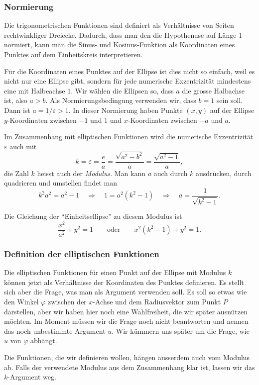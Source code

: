 \subsubsection{Normierung}
Die trigonometrischen Funktionen sind definiert als Verhältnisse 
von Seiten rechtwinkliger Dreiecke.
Dadurch, dass man den die Hypothenuse auf Länge $1$ normiert, 
kann man die Sinus- und Kosinus-Funktion als Koordinaten eines
Punktes auf dem Einheitskreis interpretieren.

Für die Koordinaten eines Punktes auf der Ellipse ist dies nicht so einfach,
weil es nicht nur eine Ellipse gibt, sondern für jede numerische Exzentrizität
mindestens eine mit Halbeachse $1$.
Wir wählen die Ellipsen so, dass $a$ die grosse Halbachse ist, also $a>b$.
Als Normierungsbedingung verwenden wir, dass $b=1$ sein soll.
Dann ist $a=1/\varepsilon>1$.
In dieser Normierung haben Punkte $(x,y)$ auf der Ellipse $y$-Koordinaten
zwischen $-1$ und $1$ und $x$-Koordinaten zwischen $-a$ und $a$.

Im Zusammenhang mit elliptischen Funktionen wird die numerische Exzentrizität
$\varepsilon$ auch mit
\[
k
=
\varepsilon
=
\frac{e}{a}
=
\frac{\sqrt{a^2-b^2}}{a}
=
\frac{\sqrt{a^2-1}}{a},
\]
die Zahl $k$ heisst auch der {\em Modulus}.
Man kann $a$ auch durch $k$ ausdrücken, durch quadrieren und umstellen
findet man
\[
k^2a^2 = a^2-1
\quad\Rightarrow\quad
1=a^2(k^2-1)
\quad\Rightarrow\quad
a=\frac{1}{\sqrt{k^2-1}}.
\]

Die Gleichung der ``Einheitsellipse'' zu diesem Modulus ist
\[
\frac{x^2}{a^2}+y^2=1
\qquad\text{oder}\qquad
x^2(k^2-1) + y^2 = 1.
\]

\subsubsection{Definition der elliptischen Funktionen}
Die elliptischen Funktionen für einen Punkt auf der Ellipse mit Modulus $k$
können jetzt als Verhältnisse der Koordinaten des Punktes definieren.
Es stellt sich aber die Frage, was man als Argument verwenden soll.
Es soll so etwas wie den Winkel $\varphi$ zwischen der $x$-Achse und dem
Radiusvektor zum Punkt $P$
darstellen, aber wir haben hier noch eine Wahlfreiheit, die wir später
ausnützen möchten.
Im Moment müssen wir die Frage noch nicht beantworten und nennen das
noch unbestimmte Argument $u$.
Wir kümmern uns später um die Frage, wie $u$ von $\varphi$ abhängt.

Die Funktionen, die wir definieren wollen, hängen ausserdem auch 
vom Modulus ab.
Falls der verwendete Modulus aus dem Zusammenhang klar ist, lassen
wir das $k$-Argument weg.


